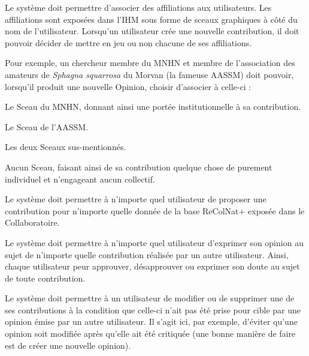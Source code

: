 \startsubsubsection[title={Notion d'affiliation}]

\exig{}
Le système doit permettre d'associer des affiliations aux utilisateurs.
Les affiliations sont exposées dans l'IHM sous forme de sceaux graphiques à côté du nom de l'utilisateur.
Lorsqu'un utilisateur crée une nouvelle contribution, il doit pouvoir décider de mettre en jeu ou non chacune de ses affiliations.

Pour exemple, un chercheur membre du MNHN et membre de l'association des amateurs de {\it Sphagna squarrosa} du Morvan (la fameuse AASSM) doit pouvoir, lorsqu'il produit une nouvelle Opinion, choisir d'associer à celle-ci :

\startitemize
	\item Le Sceau du MNHN, donnant ainsi une portée institutionnelle à sa contribution.
	\item Le Sceau de l'AASSM.
	\item Les deux Sceaux sus-mentionnés.
	\item Aucun Sceau, faisant ainsi de sa contribution quelque chose de purement individuel et n'engageant aucun collectif.
\stopitemize

\startsubsection[title={Représentation des contributions},reference:s:contributions]

\startsubsubsection[title={Opinions multiples}]

\exig{}
Le système doit permettre à n'importe quel utilisateur de proposer une contribution pour n'importe quelle donnée de la base ReColNat+ exposée dans le Collaboratoire.

\exig{}
Le système doit permettre à n'importe quel utilisateur d'exprimer son opinion au sujet de n'importe quelle contribution réalisée par un autre utilisateur.
Ainsi, chaque utilisateur peur approuver, désapprouver ou exprimer son doute au sujet de toute contribution.

\exig{}
Le système doit permettre à un utilisateur de modifier ou de supprimer une de ses contributions à la condition que celle-ci n'ait pas été prise pour cible par une opinion émise par un autre utilisateur.
Il s'agit ici, par exemple, d'éviter qu'une opinion soit modifiée après qu'elle ait été critiquée (une bonne manière de faire est de créer une nouvelle opinion).

